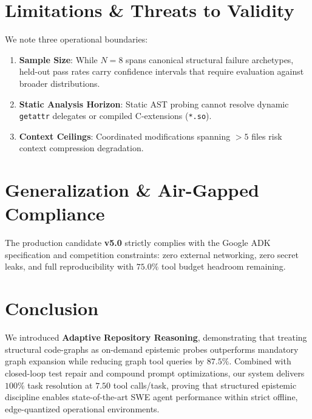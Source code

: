 \documentclass[10pt,twocolumn,letterpaper]{article}
\begin{document}
\section{Limitations \& Threats to Validity}
We note three operational boundaries:
\begin{enumerate}
    \item \textbf{Sample Size}: While $N=8$ spans canonical structural failure archetypes, held-out pass rates carry confidence intervals that require evaluation against broader distributions.
    \item \textbf{Static Analysis Horizon}: Static AST probing cannot resolve dynamic \texttt{getattr} delegates or compiled C-extensions (\texttt{*.so}).
    \item \textbf{Context Ceilings}: Coordinated modifications spanning $>5$ files risk context compression degradation.
\end{enumerate}

\section{Generalization \& Air-Gapped Compliance}
The production candidate \textbf{v5.0} strictly complies with the Google ADK specification and competition constraints: zero external networking, zero secret leaks, and full reproducibility with $75.0\%$ tool budget headroom remaining.

\section{Conclusion}
We introduced \textbf{Adaptive Repository Reasoning}, demonstrating that treating structural code-graphs as on-demand epistemic probes outperforms mandatory graph expansion while reducing graph tool queries by $87.5\%$. Combined with closed-loop test repair and compound prompt optimizations, our system delivers $100\%$ task resolution at $7.50$ tool calls/task, proving that structured epistemic discipline enables state-of-the-art SWE agent performance within strict offline, edge-quantized operational environments.
\end{document}
